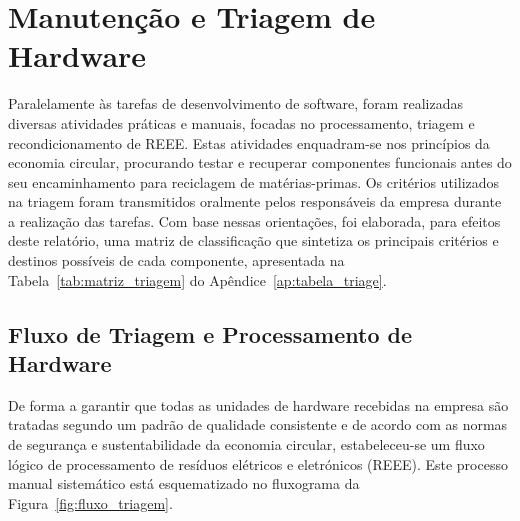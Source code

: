 \chapter{Manutenção e Triagem de Hardware}\label{chap5}
\thispagestyle{fancy}

Paralelamente às tarefas de desenvolvimento de software, foram realizadas diversas atividades práticas e manuais, focadas no processamento, triagem e recondicionamento de \ac{REEE}. Estas atividades enquadram-se nos princípios da economia circular, procurando testar e recuperar componentes funcionais antes do seu encaminhamento para reciclagem de matérias-primas. Os critérios utilizados na triagem foram transmitidos oralmente pelos responsáveis da empresa durante a realização das tarefas. Com base nessas orientações, foi elaborada, para efeitos deste relatório, uma matriz de classificação que sintetiza os principais critérios e destinos possíveis de cada componente, apresentada na Tabela~\ref{tab:matriz_triagem} do Apêndice~\ref{ap:tabela_triage}.

\section{Fluxo de Triagem e Processamento de Hardware}

De forma a garantir que todas as unidades de hardware recebidas na empresa são tratadas segundo um padrão de qualidade consistente e de acordo com as normas de segurança e sustentabilidade da economia circular, estabeleceu-se um fluxo lógico de processamento de resíduos elétricos e eletrónicos (REEE). Este processo manual sistemático está esquematizado no fluxograma da Figura~\ref{fig:fluxo_triagem}.

